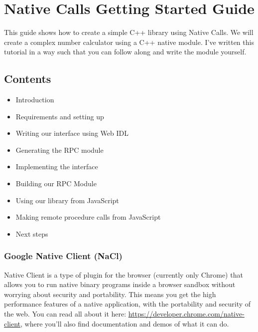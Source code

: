 \documentclass[]{article}
\author{}
\date{}
\begin{document}
\section{Native Calls Getting Started
Guide}\label{native-calls-getting-started-guide}

This guide shows how to create a simple C++ library using Native Calls.
We will create a complex number calculator using a C++ native module.
I've written this tutorial in a way such that you can follow along and
write the module yourself.

\subsection{Contents}\label{contents}

\begin{itemize}
\itemsep1pt\parskip0pt
\item
  Introduction
\item
  Requirements and setting up
\item
  Writing our interface using Web IDL
\item
  Generating the RPC module
\item
  Implementing the interface
\item
  Building our RPC Module
\item
  Using our library from JavaScript
\item
  Making remote procedure calls from JavaScript
\item
  Next steps
\end{itemize}


\subsubsection{Google Native Client
(NaCl)}\label{google-native-client-nacl}

Native Client is a type of plugin for the browser (currently only
Chrome) that allows you to run native binary programs inside a browser
sandbox without worrying about security and portability. This means you
get the high performance features of a native application, with the
portability and security of the web. You can read all about it here: 
\url{https://developer.chrome.com/native-client}, where you'll
also find documentation and demos of what it can do.
\end{document}
